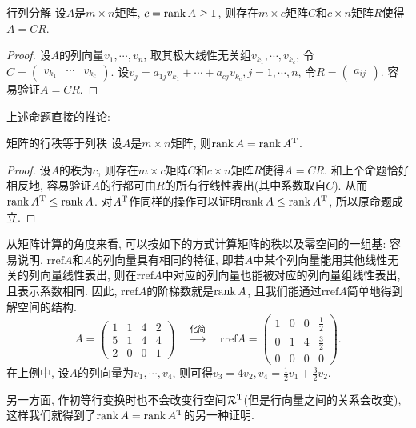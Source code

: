 \begin{proposition}{行列分解}
	设$A$是$m\times n$矩阵, $c=\operatorname{rank} A \geq 1$, 则存在$m\times c$矩阵$C$和$c \times n$矩阵$R$使得$A=CR$. 
\end{proposition}
\begin{proof}
	设$A$的列向量$v_1,\cdots ,v_n$, 取其极大线性无关组$v_{k_1},\cdots ,v_{k_c}$, 令$C=\begin{pmatrix} v_{k_1} & \cdots & v_{k_c} \end{pmatrix}$. 设$v_j = a_{1j}v_{k_1} + \cdots + a_{cj}v_{k_c}, j=1,\cdots ,n$, 令$R = \begin{pmatrix} a_{ij} \end{pmatrix}$. 容易验证$A=CR$. 
\end{proof}

上述命题直接的推论: 

\begin{proposition}{矩阵的行秩等于列秩}
	设$A$是$m\times n$矩阵, 则$\operatorname{rank} A = \operatorname{rank} A^{\operatorname{T}}$. 
\end{proposition}
\begin{proof}
	设$A$的秩为$c$, 则存在$m\times c$矩阵$C$和$c \times n$矩阵$R$使得$A=CR$. 和上个命题恰好相反地, 容易验证$A$的行都可由$R$的所有行线性表出(其中系数取自$C$). 从而$\operatorname{rank} A^{\operatorname{T}} \leq \operatorname{rank} A$. 对$A^{\operatorname{T}}$作同样的操作可以证明$\operatorname{rank} A \leq \operatorname{rank} A^{\operatorname{T}}$, 所以原命题成立. 
\end{proof}

从矩阵计算的角度来看, 可以按如下的方式计算矩阵的秩以及零空间的一组基: 容易说明, $\mathrm{rref}A$和$A$的列向量具有相同的特征, 即若$A$中某个列向量能用其他线性无关的列向量线性表出, 则在$\mathrm{rref}A$中对应的列向量也能被对应的列向量组线性表出, 且表示系数相同. 因此, $\mathrm{rref} A$的阶梯数就是$\operatorname{rank} A$, 且我们能通过$\mathrm{rref} A$简单地得到解空间的结构. $$A=\begin{pmatrix}
1 & 1 & 4 & 2 \\
5 & 1 & 4 & 4 \\
2 & 0 & 0 & 1 
\end{pmatrix}\quad \stackrel{\textit{化简}}{\longrightarrow} \quad \mathrm{rref}A = 
\begin{pmatrix}
1 & 0 & 0 & \frac{1}{2}  \\
0 & 1 & 4 & \frac{3}{2}  \\
0 & 0 & 0 & 0 
\end{pmatrix}.$$
在上例中, 设$A$的列向量为$v_1 , \cdots ,v_4$, 则可得$v_3=4v_2,v_4=\frac{1}{2}v_1+\frac{3}{2}v_2$. 

另一方面, 作初等行变换时也不会改变行空间$\mathcal{R^{\operatorname{T}}}$(但是行向量之间的关系会改变), 这样我们就得到了$\operatorname{rank} A = \operatorname{rank} A^{\operatorname{T}}$的另一种证明. 


